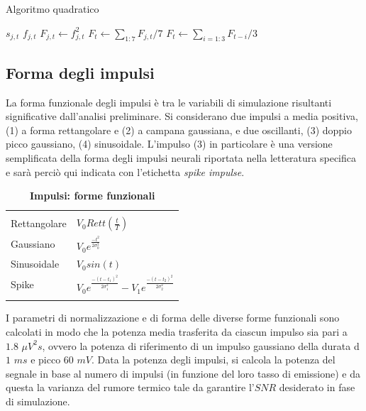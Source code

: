 \begin{algorithm}
\caption{Algoritmo quadratico}\label{alg:quad}
\begin{algorithmic}[1]
\State $s_{j,t}$ 
\State $f_{j,t}$ 
\State $F_{j,t}\gets f^{2}_{j,t}$ 
\State $F_{t}\gets \sum_{1:7}   F_{j,t}/7$ 
\State $F_{t}\gets \sum_{i=1:3} F_{t-i}/3$ 
\end{algorithmic}
\end{algorithm}



\subsection{Forma degli impulsi}

La forma funzionale degli impulsi è tra le variabili di simulazione risultanti significative dall'analisi preliminare.
Si considerano due impulsi a media positiva, (1) a forma rettangolare e (2) a campana gaussiana, e due oscillanti, (3) doppio picco gaussiano, (4) sinusoidale. L'impulso (3) in particolare è una versione semplificata della forma degli impulsi neurali riportata nella letteratura specifica e sarà perciò qui indicata con l'etichetta {\it spike impulse}.

\begin{table}
\centering
\caption{\bf Impulsi: forme funzionali}
\begin{tabular}{ll}
\hline
&\\
Rettangolare    & $V_{0}Rett(\frac{t}{T})$ \\
Gaussiano       & $V_{0}e^{\frac{-t^{2}}{2\sigma_{0}^{2}}}$ \\
Sinusoidale       & $V_{0}sin(t)$ \\
Spike           & $V_{0}e^{\frac{-(t-t_{1})^{2}}{2\sigma_{1}^{2}}} 
                   -V_{1}e^{\frac{-(t-t_{2})^{2}}{2\sigma_{2}^{2}}}$ \\
&\\
\hline
\end{tabular}
\label{tab:forme}
\end{table}

I parametri di normalizzazione e di forma delle diverse forme funzionali sono calcolati in modo che la potenza media trasferita da ciascun impulso sia pari a $1.8$ $\mu V^{2}s$, ovvero la potenza di riferimento di un impulso gaussiano della durata d $1$ $ms$ e picco $60$ $mV$.
Data la potenza degli impulsi, si calcola la potenza del segnale in base al numero di impulsi (in funzione del loro tasso di emissione) e da questa la varianza del rumore termico tale da garantire l'$SNR$ desiderato in fase di simulazione.



